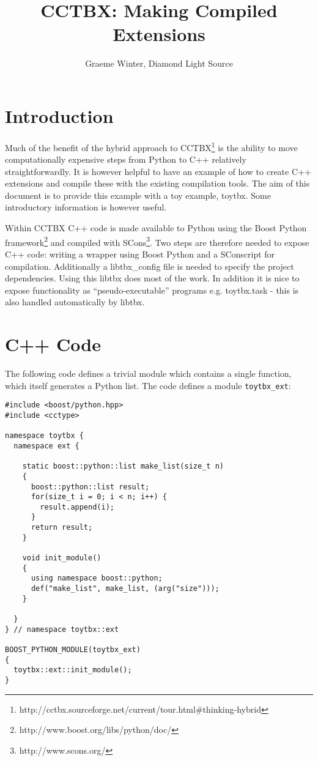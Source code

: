 \documentclass[a4paper, 11pt]{article}
\title{CCTBX: Making Compiled Extensions}
\author{Graeme Winter, Diamond Light Source}
\begin{document}
\maketitle

\section{Introduction}

Much of the benefit of the hybrid approach to CCTBX\footnote{http://cctbx.sourceforge.net/current/tour.html\#thinking-hybrid} is the ability to move computationally expensive steps from Python to C++ relatively straightforwardly. It is however helpful to have an example of how to create C++ extensions and compile these with the existing compilation tools. The aim of this document is to provide this example with a toy example, toytbx. Some introductory information is however useful.

Within CCTBX C++ code is made available to Python using the Boost Python framework\footnote{http://www.boost.org/libs/python/doc/} and compiled with SCons\footnote{http://www.scons.org/}. Two steps are therefore needed to expose C++ code: writing a wrapper using Boost Python and a SConscript for compilation. Additionally a libtbx_config file is needed to specify the project dependencies. Using this libtbx does most of the work. In addition it is nice to expose functionality as ``pseudo-executable'' programs e.g. toytbx.task - this is also handled automatically by libtbx.

\section{C++ Code}

The following code defines a trivial module which contains a single function, which itself generates a Python list. The code defines a module \verb|toytbx_ext|:

{\small
\begin{verbatim}
#include <boost/python.hpp>
#include <cctype>

namespace toytbx { 
  namespace ext {

    static boost::python::list make_list(size_t n)
    {
      boost::python::list result;
      for(size_t i = 0; i < n; i++) {
        result.append(i);
      }
      return result;
    }

    void init_module()
    {
      using namespace boost::python;
      def("make_list", make_list, (arg("size")));
    }

  }
} // namespace toytbx::ext

BOOST_PYTHON_MODULE(toytbx_ext)
{
  toytbx::ext::init_module();
}
\end{verbatim}
}
\end{document}
